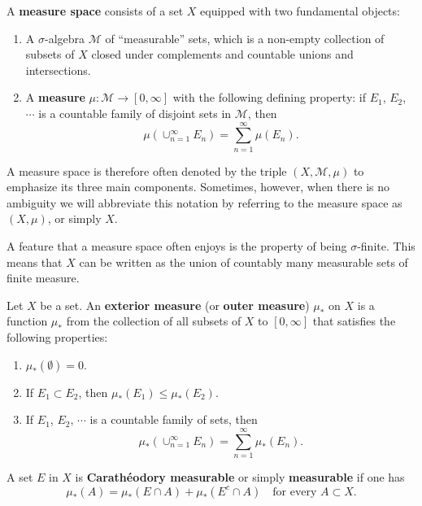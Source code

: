 A \textbf{measure space} consists of a set $X$ equipped with two fundamental objects:
\begin{enumerate}
  \item A $\sigma$-algebra $\mathcal M$ of ``measurable'' sets, which is a non-empty collection of 
  subsets of $X$ closed under complements and countable unions and intersections.
  \item A \textbf{measure} $\mu:\mathcal M\to[0,\infty]$ with the following defining property:
  if $E_1$, $E_2$, $\cdots$ is a countable family of disjoint sets in $\mathcal M$, then 
  \[
  \mu\left(\cup_{n=1}^\infty E_n\right) = \sum_{n=1}^\infty\mu(E_n).
  \]
\end{enumerate}
A measure space is therefore often denoted by the triple $(X,\mathcal M,\mu)$ to emphasize its three main components.
Sometimes, however, when there is no ambiguity we will abbreviate this notation by referring to the measure space as $(X,\mu)$, or simply $X$.

A feature that a measure space often enjoys is the property of being $\sigma$-finite.
This means that $X$ can be written as the union of countably many measurable sets of finite measure.

\begin{definition}
  Let $X$ be a set. 
  An \textbf{exterior measure} (or \textbf{outer measure}) $\mu_\ast$ on $X$ is a function $\mu_*$ 
  from the collection of all subsets of $X$ to $[0,\infty]$ that satisfies the following properties:
  \begin{enumerate}
    \item $\mu_\ast(\emptyset) = 0$.
    \item If $E_1\subset E_2$, then $\mu_\ast(E_1) \leq \mu_*(E_2)$.
    \item If $E_1$, $E_2$, $\cdots$ is a countable family of sets, then 
    \[
      \mu_*\left(\cup_{n=1}^\infty E_n\right) = \sum_{n=1}^\infty\mu_\ast(E_n).
    \]
  \end{enumerate}
\end{definition}

\begin{definition}
  A set $E$ in $X$ is \textbf{Carath\'eodory measurable} or simply \textbf{measurable} if one has 
  \begin{equation}
    \label{eq: def of being Caratheodory measurable}
  \mu_*(A) = \mu_*(E\cap A) + \mu_*(E^c\cap A)\quad \text{for every }A\subset X.
  \end{equation}
\end{definition}

